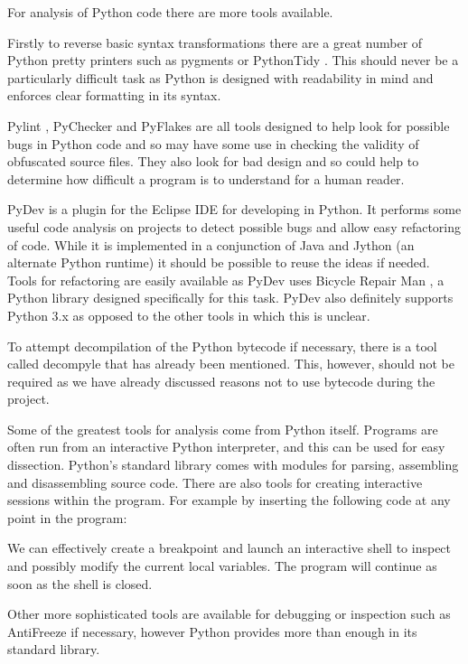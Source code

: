 \documentclass[twoside,a4paper]{report}
\begin{document}
For analysis of Python code there are more tools available.

Firstly to reverse basic syntax transformations there are a great number of Python pretty printers such as
pygments \cite{pygments} or PythonTidy \cite{pythontidy}. This should never be a particularly difficult task as Python is
designed with readability in mind and enforces clear formatting in its syntax.

Pylint \cite{pylint}, PyChecker \cite{pychecker} and PyFlakes \cite{pyflakes} are all tools designed to help look for possible
bugs in Python code and so may have some use in checking the validity of obfuscated source files. They also look for bad design and so
could help to determine how difficult a program is to understand for a human reader.

PyDev \cite{pydev} is a plugin for the Eclipse IDE for developing in Python. It performs some useful code analysis on projects to detect
possible bugs and allow easy refactoring of code. While it is implemented in a conjunction of Java and Jython (an alternate Python runtime)
it should be possible to reuse the ideas if needed. Tools for refactoring are easily available as PyDev uses Bicycle Repair
Man \cite{bikerepair}, a Python library designed specifically for this task. PyDev also definitely supports Python 3.x as opposed to the
other tools in which this is unclear.

To attempt decompilation of the Python bytecode if necessary, there is a tool called decompyle \cite{decompyle} that has already been
mentioned. This, however, should not be required as we have already discussed reasons not to use bytecode during the project.

Some of the greatest  tools for analysis come from Python itself. Programs are often run from an interactive Python interpreter, and this
can be used for easy dissection. Python's standard library comes with modules for parsing, assembling and disassembling source code.
There are also tools for creating interactive sessions within the program. For example by inserting the following code at any point
in the program:



We can effectively create a breakpoint and launch an interactive shell to inspect and possibly modify the current local
variables. The program will continue as soon as the shell is closed.

Other more sophisticated tools are available for debugging or inspection such as AntiFreeze \cite{pirates} if necessary,
however Python provides more than enough in its standard library.
\end{document}
